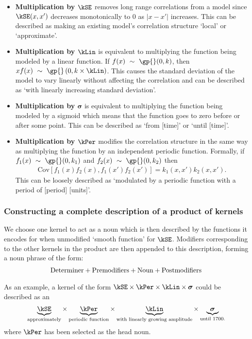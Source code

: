\begin{itemize}
\item {\bf Multiplication by $\kSE$} removes long range correlations from a model since $\kSE(x,x')$ decreases monotonically to 0 as $|x - x'|$ increases.
This can be described as making an existing model's correlation structure `local' or `approximate'.
\item {\bf Multiplication by $\kLin$} is equivalent to multiplying the function being modeled by a linear function.
If $f(x) \dist \gp{}(0, \kernel)$, then $xf(x) \dist \gp{}\left(0, k \times \kLin \right)$.
This causes the standard deviation of the model to vary linearly without affecting the correlation and can be described as \eg `with linearly increasing standard deviation'.
\item {\bf Multiplication by $\boldsymbol\sigma$} is equivalent to multiplying the function being modeled by a sigmoid which means that the function goes to zero before or after some point.
This can be described as \eg `from [time]' or `until [time]'.
\item {\bf Multiplication by $\kPer$}
modifies the correlation structure in the same way as multiplying the function by an independent periodic function.
Formally, if ${f_1(x) \dist \gp{}(0, \kernel_1)}$ and ${f_2(x) \dist \gp{}(0, \kernel_2)}$ then
\begin{align}
{\textrm{Cov} \left[f_1(x)f_2(x), f_1(x')f_2(x') \right] = k_1(x,x')k_2(x,x')}.\nonumber
\end{align}
This can be loosely described as \eg `modulated by a periodic function with a period of [period] [units]'.
\end{itemize}


\subsubsection{Constructing a complete description of a product of kernels}
We choose one kernel to act as a noun which is then described by the functions it encodes for when unmodified \eg `smooth function' for $\kSE$.
Modifiers corresponding to the other kernels in the product are then appended to this description, forming a noun phrase of the form:
\begin{align*}
\textnormal{Determiner}	+	\textnormal{Premodifiers} +	\textnormal{Noun}	+	\textnormal{Postmodifiers}
\end{align*}

As an example, a kernel of the form $\kSE \times \kPer \times  \kLin \times \boldsymbol{\sigma}$ could be described as an
\begin{align*}
\underbrace{\kSE}_{\textnormal{\scriptsize approximately}} \times 
\underbrace{\kPer}_{\textnormal{\scriptsize periodic function}} \times 
\underbrace{\kLin}_{\textnormal{\scriptsize with linearly growing amplitude}} \times 
\underbrace{\boldsymbol{\sigma}}_{\textnormal{\scriptsize until 1700.}}
\end{align*}
where $\kPer$ has been selected as the head noun.

